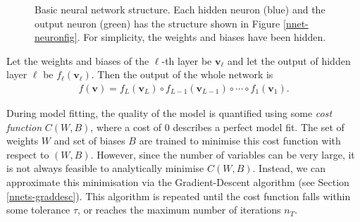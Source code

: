 \begin{figure}
\caption{Basic neural network structure. Each hidden neuron (blue) and the output neuron (green) has the structure shown in Figure \ref{nnet-neuronfig}. For simplicity, the weights and biases have been hidden.}
\end{figure}

Let the weights and biases of the $\ell$-th layer be $\mathbf{v}_\ell$ and let the output of hidden layer $\ell$ be $f_\ell(\mathbf{v}_\ell)$. Then the output of the whole network is
\begin{align}
	f(\mathbf{v}) = f_L(\mathbf{v}_L) \circ f_{L-1}(\mathbf{v}_{L-1}) \circ \cdots \circ f_1(\mathbf{v}_1).
\end{align}

During model fitting, the quality of the model is quantified using some \textit{cost function} $C(W,B)$, where a cost of 0 describes a perfect model fit. The set of weights $W$ and set of biases $B$ are trained to minimise this cost function with respect to $(W,B)$. However, since the number of variables can be very large, it is not always feasible to analytically minimise $C(W,B)$. Instead, we can approximate this minimisation via the Gradient-Descent algorithm (see Section \ref{nnets-graddesc}). This algorithm is repeated until the cost function falls within some tolerance $\tau$, or reaches the maximum number of iterations $n_T$.



